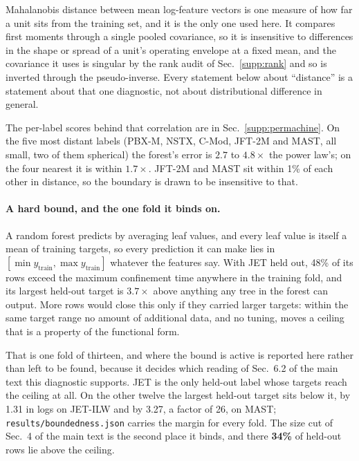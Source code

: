 \documentclass[12pt,letterpaper]{article}
\begin{document}
Mahalanobis distance between mean log-feature vectors is one measure of how far
a unit sits from the training set, and it is the only one used here. It
compares first moments through a single pooled covariance, so it is insensitive
to differences in the shape or spread of a unit's operating envelope at a
fixed mean, and the covariance it uses is singular by the rank audit of Sec.~\ref{supp:rank} and so
is inverted through the pseudo-inverse. Every statement below about ``distance''
is a statement about that one diagnostic, not about distributional difference in
general.

The per-label scores behind that correlation are in Sec.~\ref{supp:permachine}.
On the five most distant labels (PBX-M, NSTX, C-Mod, JFT-2M and MAST, all
small, two of them spherical) the forest's error is $2.7$ to $4.8\times$ the
power law's; on the four nearest it is within $1.7\times$. JFT-2M and MAST sit
within 1\% of each other in distance, so the boundary is drawn to be
insensitive to that.

\paragraph{A hard bound, and the one fold it binds on.} A random forest predicts
by averaging leaf values, and every leaf value is itself a mean of training
targets, so every prediction it can make lies in
$[\min y_{\text{train}}, \max y_{\text{train}}]$ whatever the features say. With
JET held out, 48\% of its rows exceed the maximum confinement time anywhere in
the training fold, and its largest held-out target is $3.7\times$ above anything
any tree in the forest can output. More rows would close this only if they
carried larger targets: within the same target range no amount of additional
data, and no tuning, moves a ceiling that is a property of the functional form.

That is one fold of thirteen, and where the bound is active is reported here
rather than left to be found, because it decides which reading of
Sec.~6.2 of the main text this diagnostic supports. JET is the only held-out label whose
targets reach the ceiling at all. On the other twelve the largest held-out
target sits below it, by 1.31 in logs on JET-ILW and by 3.27, a factor of 26, on
MAST; \texttt{results/boundedness.json} carries the margin for every fold. The
size cut of Sec.~4 of the main text is the second place it binds, and there
\textbf{34\%} of held-out rows lie above the ceiling.
\end{document}
